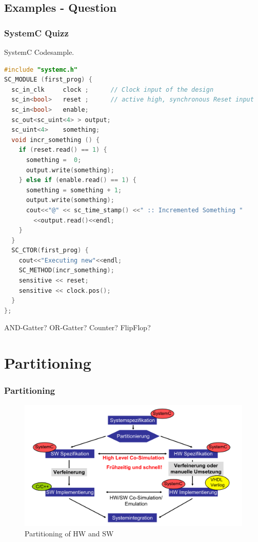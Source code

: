 \documentclass{beamer}
\begin{document}
\subsection{Examples - Question}
\begin{frame}[fragile]\frametitle{SystemC Quizz} 
SystemC Codesample.
\begin{lstlisting}[language=C++,basicstyle=\tiny]
#include "systemc.h"
SC_MODULE (first_prog) {
  sc_in_clk     clock ;      // Clock input of the design
  sc_in<bool>   reset ;      // active high, synchronous Reset input
  sc_in<bool>   enable;     
  sc_out<sc_uint<4> > output;
  sc_uint<4>	something;
  void incr_something () {
    if (reset.read() == 1) {
      something =  0;
      output.write(something);
    } else if (enable.read() == 1) {
      something = something + 1;
      output.write(something);
      cout<<"@" << sc_time_stamp() <<" :: Incremented Something "
        <<output.read()<<endl;
    }
  }
  SC_CTOR(first_prog) {
    cout<<"Executing new"<<endl;
    SC_METHOD(incr_something);
    sensitive << reset;
    sensitive << clock.pos();
  }
};
\end{lstlisting}
AND-Gatter? OR-Gatter? Counter? FlipFlop?
\end{frame}

\section{Partitioning}
\begin{frame}\frametitle{Partitioning} 
	    \begin{figure}[hp]
	      \centering
	      \includegraphics[width=1.0\textwidth]{pictures/design_flow.pdf}
	      \caption{Partitioning of HW and SW \cite{braunschweig}}
	      \label{fig:flow}
	    \end{figure} 



\end{frame}
\end{document}

